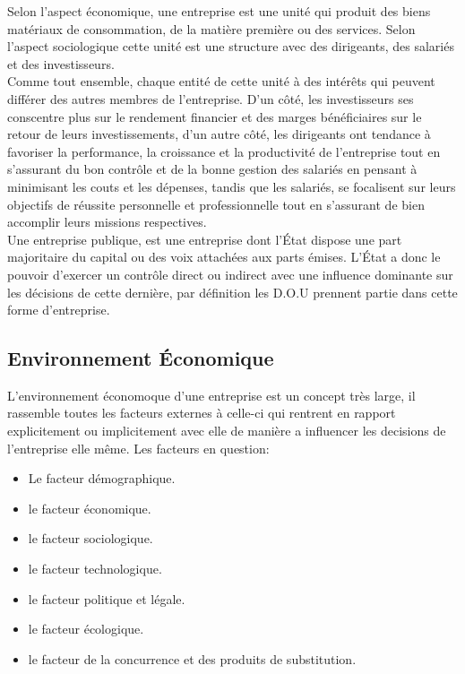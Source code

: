 Selon l'aspect économique, une entreprise est une unité qui produit des biens matériaux de consommation, de la matière première ou des services. Selon l'aspect sociologique cette unité est une structure avec des dirigeants, des salariés et des investisseurs.\\ 

Comme tout ensemble, chaque entité de cette unité à des intérêts qui peuvent différer des autres membres de l'entreprise. D'un côté, les investisseurs ses conscentre plus sur le rendement financier et des marges bénéficiaires sur le retour de leurs investissements, d'un autre côté, les dirigeants ont tendance à favoriser la performance, la croissance et la productivité de l'entreprise tout en s'assurant du bon contrôle et de la bonne gestion des salariés en pensant à minimisant les couts et les dépenses, tandis que les salariés, se focalisent sur leurs objectifs de réussite personnelle et professionnelle tout en s'assurant de bien accomplir leurs missions respectives.\\

Une entreprise publique, est une entreprise dont l'État dispose une part majoritaire du capital ou des voix attachées aux parts émises. L'État a donc le pouvoir d'exercer un contrôle direct ou indirect avec une influence dominante sur les décisions de cette dernière\cite{def-entreprise-pub}, par définition les \acs{D.O.U} prennent partie dans cette forme d'entreprise.\\

\subsection{Environnement Économique \cite{env-entreprise}}
L'environnement économoque d'une entreprise est un concept très large, il rassemble toutes les facteurs externes à celle-ci qui rentrent en rapport explicitement ou implicitement avec elle de manière a influencer les decisions de l'entreprise elle même. Les facteurs en question:\\

\begin{itemize}
    \item Le facteur démographique.
    \item le facteur économique.
    \item le facteur sociologique.
    \item le facteur technologique.
    \item le facteur politique et légale.
    \item le facteur écologique.
    \item le facteur de la concurrence et des produits de substitution.\\
\end{itemize}

